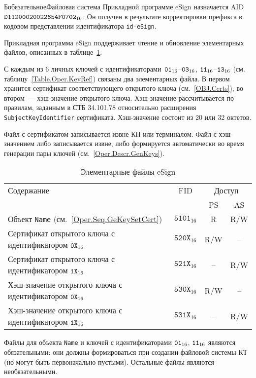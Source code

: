 \begin{appendix}{Б}{обязательное}{Файловая система}
Прикладной программе eSign назначается AID~$\texttt{D11200020022654F0702}_{16}$. 
Он получен в результате корректировки префикса в кодовом представлении 
идентификатора \verb|id-eSign|.

Прикладная программа eSign поддерживает чтение и обновление 
элементарных файлов, описанных в таблице~\ref{Table.FILES.EFSIGN}.

С каждым из 6 личных ключей с идентификаторами~$\texttt{01}_{16}$--$\texttt{03}_{16}$,
$\texttt{11}_{16}$--$\texttt{13}_{16}$ (см. таблицу~\ref{Table.Oper.KeyRef}) 
связаны два элементарных файла. 
В первом хранится сертификат соответствующего открытого ключа 
(см.~\ref{OBJ.Certs}), во втором~--- хэш-значение открытого ключа.
%
Хэш-значение рассчитывается по правилам, заданным в СТБ 34.101.78
относительно расширения \texttt{SubjectKeyIdentifier} сертификата.
%
Хэш-значение состоит из 20 или 32 октетов.

Файл с сертификатом записывается извне КП или терминалом.
Файл с хэш-значением либо записывается извне, либо формируется 
автоматически во время генерации пары ключей 
(см.~\ref{Oper.Descr.GenKeys}).

\begin{table}[H]
\caption{Элементарные файлы eSign}
\label{Table.FILES.EFSIGN}
\begin{tabular}{|l|c|c|c|}
\hline
Содержание & FID & \multicolumn{2}{|c|}{Доступ}\\
\cline{3-4}
&& PS & AS \\
\hline
\hline
Объект \texttt{Name} (см.~\ref{Oper.Seq.GeKeySetCert}) & 
$\texttt{5101}_{16}$ & R & R/W \\
Сертификат открытого ключа с идентификатором $\texttt{0X}_{16}$ & 
$\texttt{520X}_{16}$ & R/W & -- \\
Сертификат открытого ключа с идентификатором $\texttt{1X}_{16}$ & 
$\texttt{521X}_{16}$ & -- & R/W \\
Хэш-значение открытого ключа с идентификатором $\texttt{0X}_{16}$ & 
$\texttt{530X}_{16}$ & R/W & -- \\
Хэш-значение открытого ключа с идентификатором $\texttt{1X}_{16}$ & 
$\texttt{531X}_{16}$ & -- & R/W \\
\hline
\end{tabular}
\end{table}

Файлы для объекта \texttt{Name} и ключей с идентификаторами $\texttt{01}_{16}$, $\texttt{11}_{16}$
являются обязательными: они должны формироваться при создании файловой 
системы КТ (но могут быть первоначально пустыми). 
Остальные файлы являются необязательными.

\end{appendix}